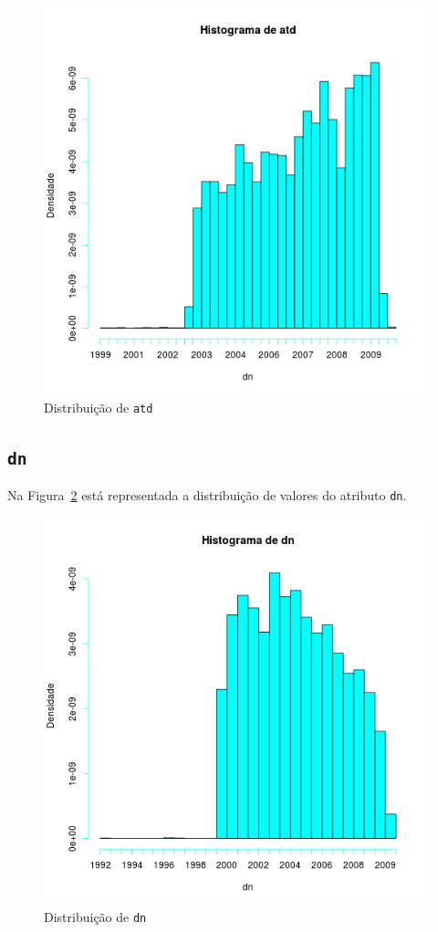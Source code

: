 \documentclass[10pt, conference, compsocconf]{IEEEtran}
\begin{document}
\begin{figure}[H]
  \centering
  \includegraphics[scale=0.4]{img/pre_atd.png}
  \caption{Distribuição de {\tt atd}}
  \label{fig:preatd}
\end{figure}

\subsection{\texttt{dn}}
Na Figura~\ref{fig:predn} está representada a distribuição de valores
do atributo {\tt dn}.

\begin{figure}[H]
  \centering
  \includegraphics[scale=0.4]{img/pre_dn.png}
  \caption{Distribuição de {\tt dn}}
  \label{fig:predn}
\end{figure}
\end{document}
